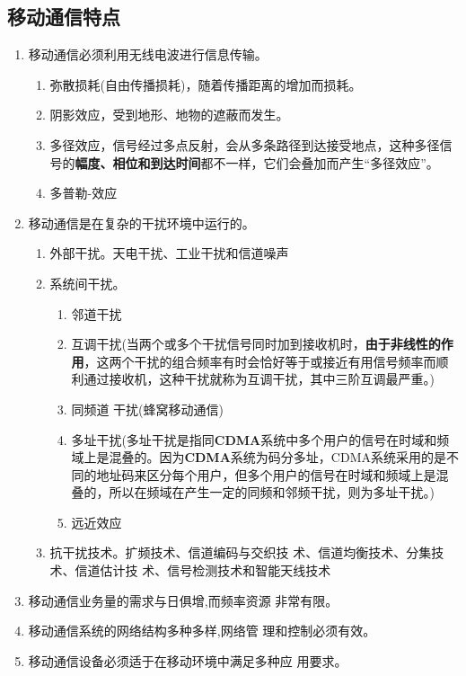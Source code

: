 	\subsection{移动通信特点}
	\begin{enumerate}
		\item 移动通信必须利用无线电波进行信息传输。
		\begin{enumerate}
			\item 弥散损耗(自由传播损耗)，随着传播距离的增加而损耗。
			\item 阴影效应，受到地形、地物的遮蔽而发生。
			\item 多径效应，信号经过多点反射，会从多条路径到达接受地点，这种多径信号的\textbf{幅度、相位和到达时间}都不一样，它们会叠加而产生“多径效应”。
			\item 多普勒-效应
		\end{enumerate}
		\item 移动通信是在复杂的干扰环境中运行的。
		\begin{enumerate}
			\item 外部干扰。天电干扰、工业干扰和信道噪声
			
			\item 系统间干扰。
			\begin{enumerate}
				\item 邻道干扰
				\item 互调干扰(当两个或多个干扰信号同时加到接收机时，\textbf{由于非线性的作用}，这两个干扰的组合频率有时会恰好等于或接近有用信号频率而顺利通过接收机，这种干扰就称为互调干扰，其中三阶互调最严重。)
				\item 同频道
				干扰(蜂窝移动通信)
				\item 多址干扰(多址干扰是指同\textbf{CDMA}系统中多个用户的信号在时域和频域上是混叠的。因为\textbf{CDMA}系统为码分多址，CDMA系统采用的是不同的地址码来区分每个用户，但多个用户的信号在时域和频域上是混叠的，所以在频域在产生一定的同频和邻频干扰，则为多址干扰。)
				\item 远近效应
			\end{enumerate}
			
			\item 抗干扰技术。扩频技术、信道编码与交织技
			术、信道均衡技术、分集技术、信道估计技
			术、信号检测技术和智能天线技术
			
		\end{enumerate}
		\item 移动通信业务量的需求与日俱增,而频率资源
		非常有限。
		\item 移动通信系统的网络结构多种多样,网络管
		理和控制必须有效。
		\item 移动通信设备必须适于在移动环境中满足多种应
		用要求。
	\end{enumerate}
